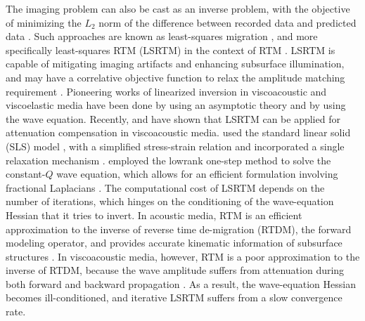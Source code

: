 The imaging problem can also be cast as an inverse problem, with the objective of minimizing the $L_2$ norm of the difference between recorded data and predicted data \cite[]{ronen2000}. Such approaches are known as least-squares migration \cite[]{nemeth99,tang09,dai11}, and more specifically least-squares RTM (LSRTM) in the context of RTM \cite[]{wong11,dai12,dai13,zhang13ls,yujin,me14a,xue14,hou15}. LSRTM is capable of mitigating imaging artifacts and enhancing subsurface illumination, and may have a correlative objective function to relax the amplitude matching requirement \cite[]{zhang14}. Pioneering works of linearized inversion in viscoacoustic and viscoelastic media have been done by \cite{ribodetti95,ribodetti00} using an asymptotic theory and by \cite{blanch94,blanch95b} using the wave equation. Recently, \cite{dutta14} and \cite{me14b} have shown that LSRTM can be applied for attenuation compensation in viscoacoustic media. \cite{dutta14} used the standard linear solid (SLS) model \cite[]{rob94,blanch95}, with a simplified stress-strain relation and incorporated a single relaxation mechanism \cite[]{blanch95b}. \cite{me14b} employed the lowrank one-step method to solve the constant-$Q$ wave equation, which allows for an efficient formulation involving fractional Laplacians \cite[]{carc10,zhu14a}. The computational cost of LSRTM depends on the number of iterations, which hinges on the conditioning of the wave-equation Hessian that it tries to invert. In acoustic media, RTM is an efficient approximation to the inverse of reverse time de-migration (RTDM), the forward modeling operator, and provides accurate kinematic information of subsurface structures \cite[]{symes08}. In viscoacoustic media, however, RTM is a poor approximation to the inverse of RTDM, because the wave amplitude suffers from attenuation during both forward and backward propagation \cite[]{zhu14a,me15a}. As a result, the wave-equation Hessian becomes ill-conditioned, and iterative LSRTM suffers from a slow convergence rate.  

